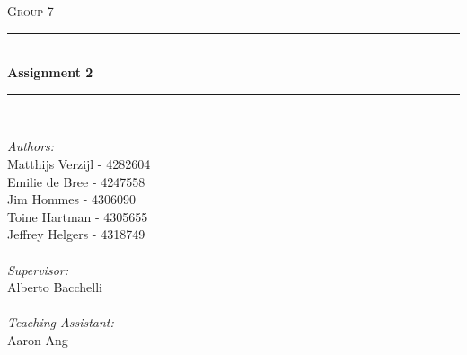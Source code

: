 \begin{titlepage}

\newcommand{\HRule}{\rule{\linewidth}{0.5mm}} %

\center %
 

\textsc{\LARGE Group 7}\\[1.5cm] %


\HRule \\[0.4cm]
{ \huge \bfseries Assignment 2}\\[0.4cm] %
\HRule \\[4cm]
 

\begin{minipage}{0.5\textwidth}
\emph{Authors:}\\     
Matthijs Verzijl - 4282604\\
Emilie de Bree - 4247558\\
Jim Hommes - 4306090\\
Toine Hartman - 4305655\\
Jeffrey Helgers - 4318749 \\\\
\emph{Supervisor:} \\
Alberto Bacchelli \\\\
\emph{Teaching Assistant:} \\
Aaron Ang\\
\end{minipage}\\[4cm]




\end{titlepage}
